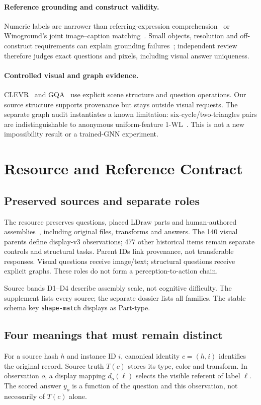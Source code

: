 \documentclass[10pt,twocolumn,letterpaper]{article}
\begin{document}
\paragraph{Reference grounding and construct validity.}
Numeric labels are narrower than referring-expression
comprehension~\cite{mao2016refexp} or Winoground's joint image--caption
matching~\cite{thrush2022winoground}. Small objects, resolution and
off-construct requirements can explain grounding
failures~\cite{diwan2022winoground}; independent review therefore judges
exact questions and pixels, including visual answer uniqueness.

\paragraph{Controlled visual and graph evidence.}
CLEVR~\cite{johnson2017clevr} and GQA~\cite{hudson2019gqa} use explicit
scene structure and question operations. Our source structure supports
provenance but stays outside visual requests. The separate graph audit
instantiates a known limitation: six-cycle/two-triangles pairs are
indistinguishable to anonymous uniform-feature 1-WL~\cite{xu2019gnn}.
This is not a new impossibility result or a trained-GNN experiment.

\section{Resource and Reference Contract}
\subsection{Preserved sources and separate roles}
The resource preserves \EvTasks{} questions, \EvParts{} placed LDraw
parts and \EvSources{} human-authored assemblies~\cite{ldraw}, including
original files, transforms and answers. The 140 visual parents define
display-v3 observations; 477 other historical items remain separate
controls and structural tasks. Parent IDs link provenance, not
transferable responses. Visual questions receive image/text; structural
questions receive explicit graphs. These roles do not form a
perception-to-action chain.

Source bands D1--D4 describe assembly scale, not cognitive difficulty.
The supplement lists every source; the separate dossier lists all families.
The stable schema key \texttt{shape-match} displays as Part-type.

\subsection{Four meanings that must remain distinct}
For a source hash $h$ and instance ID $i$, canonical identity
$c=(h,i)$ identifies the original record. Source truth $T(c)$ stores
its type, color and transform. In observation $o$, a display mapping
$d_o(\ell)$ selects the visible referent of label $\ell$. The scored
answer $y_o$ is a function of the question and this observation,
not necessarily of $T(c)$ alone.
\end{document}
